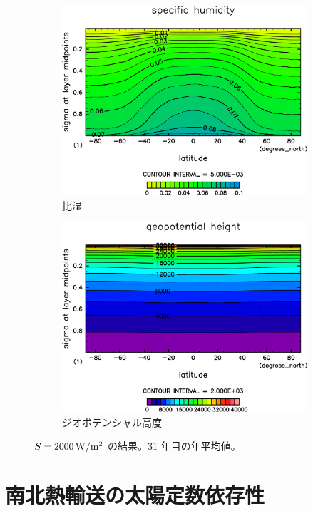 \documentclass[body]{subfiles}
\begin{document}
\begin{figure}[t]
\begin{subfigure}{.4\textwidth}
		\includegraphics[width=\columnwidth]{S2000/QH2OVap,time=7300:7665-crop-rotate.pdf}
		\caption{比湿}\label{S2000比湿}
	\end{subfigure}
	\begin{subfigure}{.4\textwidth}
		\centering
		\includegraphics[width=\columnwidth]{S2000/Height,time=7300:7665-crop-rotate.pdf}
		\caption{ジオポテンシャル高度}\label{S2000ジオポテンシャル高度}
	\end{subfigure}
	\caption{
		\(S=2000\hmu{W/m^2}\) の結果。31 年目の年平均値。
	}\label{S2000}
\end{figure}

\section{南北熱輸送の太陽定数依存性}
\end{document}
